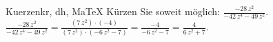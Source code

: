 \begin{MAufgabe}{Kuerzen}{kr, dh, MaTeX}
K\"urzen Sie soweit m\"oglich: $\frac{- 28\, z^2}{ - 42\, z^4 - 49\, z^2}$.\\ 
\ifLsg\MLoesung
\quad $\frac{- 28\, z^2}{ - 42\, z^4 - 49\, z^2}=\frac{(7\, z^2)\cdot(-4)}{(7\, z^2)\cdot( - 6\, z^2 - 7)}=\frac{-4}{ - 6\, z^2 - 7}=\frac{4}{6\, z^2 + 7}$.\else\relax\fi
 \end{MAufgabe}